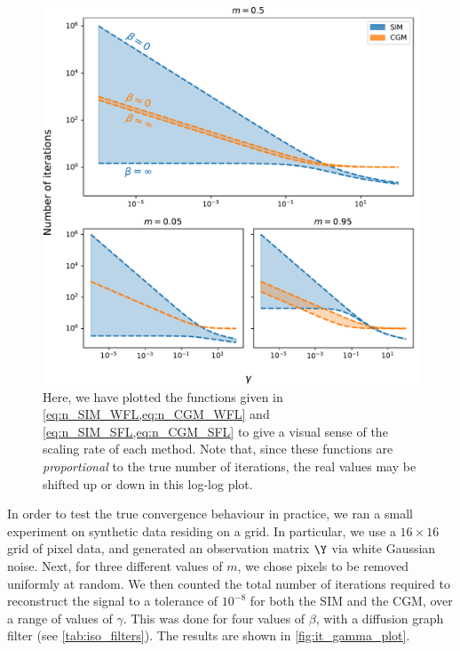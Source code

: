 \vspace{0.5cm}

\begin{figure}[hb]
    \begin{center} 
    \includegraphics[width=0.85\linewidth]{Figures/conv_SIM_CGM_compared.pdf}
    \end{center}
    \caption{\small{ Here, we have plotted the functions given in \cref{eq:n_SIM_WFL,eq:n_CGM_WFL} } and \cref{eq:n_SIM_SFL,eq:n_CGM_SFL} to give a visual sense of the scaling rate of each method. Note that, since these functions are \textit{proportional} to the true number of iterations, the real values may be shifted up or down in this log-log plot.}
    \label{fig:conv_SIM_CGM_compared}
\end{figure}

In order to test the true convergence behaviour in practice, we ran a small experiment on synthetic data residing on a grid. In particular, we use a $16 \times 16$ grid of pixel data, and generated an observation matrix $\Y$ via white Gaussian noise. Next, for three different values of $m$, we chose pixels to be removed uniformly at random. We then counted the total number of iterations required to reconstruct the signal to a tolerance of $10^{-8}$ for both the SIM and the CGM, over a range of values of $\gamma$. This was done for four values of $\beta$, with a diffusion graph filter (see \cref{tab:iso_filters}). The results are shown in \cref{fig:it_gamma_plot}. 

\vspace{0.5cm}

